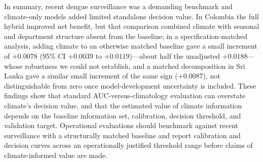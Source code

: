 \documentclass[11pt,a4paper]{article}
\begin{document}
In summary, recent dengue surveillance was a demanding benchmark and climate-only models added limited standalone decision value. In Colombia the full hybrid improved net benefit, but that comparison combined climate with seasonal and department structure absent from the baseline; in a specification-matched analysis, adding climate to an otherwise matched baseline gave a small increment of $+0.0078$ (95\% CI $+0.0039$ to $+0.0119$)---about half the unadjusted $+0.0188$---whose robustness we could not establish, and a matched decomposition in Sri Lanka gave a similar small increment of the same sign ($+0.0087$), not distinguishable from zero once model-development uncertainty is included. These findings show that standard AUC-versus-climatology evaluation can overstate climate's decision value, and that the estimated value of climate information depends on the baseline information set, calibration, decision threshold, and validation target. Operational evaluations should benchmark against recent surveillance with a structurally matched baseline and report calibration and decision curves across an operationally justified threshold range before claims of climate-informed value are made.

\end{document}
